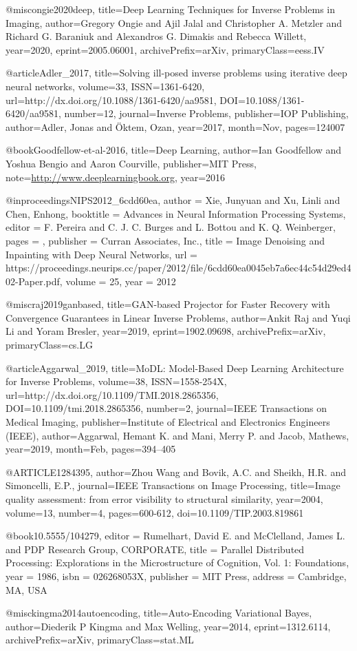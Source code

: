 @misc{ongie2020deep,
      title={Deep Learning Techniques for Inverse Problems in Imaging}, 
      author={Gregory Ongie and Ajil Jalal and Christopher A. Metzler and Richard G. Baraniuk and Alexandros G. Dimakis and Rebecca Willett},
      year={2020},
      eprint={2005.06001},
      archivePrefix={arXiv},
      primaryClass={eess.IV}
}

@article{Adler_2017,
   title={Solving ill-posed inverse problems using iterative deep neural networks},
   volume={33},
   ISSN={1361-6420},
   url={http://dx.doi.org/10.1088/1361-6420/aa9581},
   DOI={10.1088/1361-6420/aa9581},
   number={12},
   journal={Inverse Problems},
   publisher={IOP Publishing},
   author={Adler, Jonas and Öktem, Ozan},
   year={2017},
   month={Nov},
   pages={124007}
}

@book{Goodfellow-et-al-2016,
    title={Deep Learning},
    author={Ian Goodfellow and Yoshua Bengio and Aaron Courville},
    publisher={MIT Press},
    note={\url{http://www.deeplearningbook.org}},
    year={2016}
}

@inproceedings{NIPS2012_6cdd60ea,
	author = {Xie, Junyuan and Xu, Linli and Chen, Enhong},
	booktitle = {Advances in Neural Information Processing Systems},
	editor = {F. Pereira and C. J. C. Burges and L. Bottou and K. Q. Weinberger},
	pages = {},
	publisher = {Curran Associates, Inc.},
	title = {Image Denoising and Inpainting with Deep Neural Networks},
	url = {https://proceedings.neurips.cc/paper/2012/file/6cdd60ea0045eb7a6ec44c54d29ed402-Paper.pdf},
	volume = {25},
	year = {2012}
}

@misc{raj2019ganbased,
	title={GAN-based Projector for Faster Recovery with Convergence Guarantees in Linear Inverse Problems}, 
	author={Ankit Raj and Yuqi Li and Yoram Bresler},
	year={2019},
	eprint={1902.09698},
	archivePrefix={arXiv},
	primaryClass={cs.LG}
}

@article{Aggarwal_2019,
	title={MoDL: Model-Based Deep Learning Architecture for Inverse Problems},
	volume={38},
	ISSN={1558-254X},
	url={http://dx.doi.org/10.1109/TMI.2018.2865356},
	DOI={10.1109/tmi.2018.2865356},
	number={2},
	journal={IEEE Transactions on Medical Imaging},
	publisher={Institute of Electrical and Electronics Engineers (IEEE)},
	author={Aggarwal, Hemant K. and Mani, Merry P. and Jacob, Mathews},
	year={2019},
	month={Feb},
	pages={394–405}
}

@ARTICLE{1284395,
	author={Zhou Wang and Bovik, A.C. and Sheikh, H.R. and Simoncelli, E.P.},
	journal={IEEE Transactions on Image Processing}, 
	title={Image quality assessment: from error visibility to structural similarity}, 
	year={2004},
	volume={13},
	number={4},
	pages={600-612},
	doi={10.1109/TIP.2003.819861}}

@book{10.5555/104279,
	editor = {Rumelhart, David E. and McClelland, James L. and PDP Research Group, CORPORATE},
	title = {Parallel Distributed Processing: Explorations in the Microstructure of Cognition, Vol. 1: Foundations},
	year = {1986},
	isbn = {026268053X},
	publisher = {MIT Press},
	address = {Cambridge, MA, USA}
}

@misc{kingma2014autoencoding,
	title={Auto-Encoding Variational Bayes}, 
	author={Diederik P Kingma and Max Welling},
	year={2014},
	eprint={1312.6114},
	archivePrefix={arXiv},
	primaryClass={stat.ML}
}